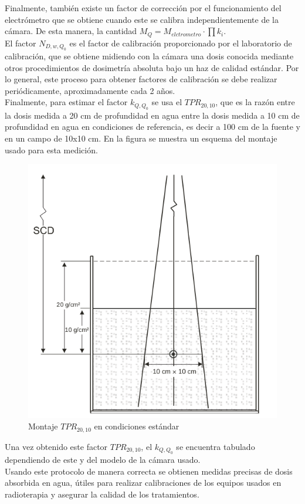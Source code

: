 Finalmente, también existe un factor de corrección por el funcionamiento del electrómetro que se obtiene cuando este se calibra independientemente de la cámara. De esta manera, la cantidad $M_Q=M_{elctrometro}\cdot \prod k_i$.\\

El factor $N_{D,w,Q_{0}}$ es el factor de calibración proporcionado por el laboratorio de calibración, que se obtiene midiendo con la cámara una dosis conocida mediante otros procedimientos de dosimetría absoluta bajo un haz de calidad estándar. Por lo general, este proceso para obtener factores de calibración se debe realizar periódicamente, aproximadamente cada 2 años.\\

Finalmente, para estimar el factor $k_{Q,Q_{0}}$ se usa el $TPR_{20,10}$, que es la razón entre la dosis medida a 20 cm de profundidad en agua entre la dosis medida a 10 cm de profundidad en agua en condiciones de referencia, es decir a 100 cm de la fuente y en un campo de 10x10 cm. En la figura se muestra un esquema del montaje usado para esta medición.\\
 \begin{figure}[H]
 	\centering
 	\includegraphics[width=0.7\linewidth]{images/TPR2010.png}
 	\caption{Montaje $TPR_{20,10} $ en condiciones estándar\cite{TPR398}}
 	\label{fig:TPR2010}
 \end{figure}
Una vez obtenido este factor $TPR_{20,10}$, el $k_{Q,Q_{0}}$ se encuentra tabulado dependiendo de este y del modelo de la cámara usado\cite{TPR398}.\\

Usando este protocolo de manera correcta se obtienen medidas precisas de dosis absorbida en agua, útiles para realizar calibraciones de los equipos usados en radioterapia y asegurar la calidad de los tratamientos.\\


